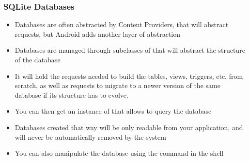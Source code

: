 \begin{frame}
  \frametitle{SQLite Databases}
  \begin{itemize}
  \item Databases are often abstracted by Content Providers, that will
    abstract requests, but Android adds another layer of abstraction
  \item Databases are managed through subclasses of
     that will abstract the structure of the
    database
  \item It will hold the requests needed to build the
    tables, views, triggers, etc. from scratch, as well as requests
    to migrate to a newer version of the same
    database if its structure has to evolve.
  \item You can then get an instance of  that
    allows to query the database
  \item Databases created that way will be only readable from your
    application, and will never be automatically removed by the system
  \item You can also manipulate the database using the 
    command in the shell
  \end{itemize}
\end{frame}
